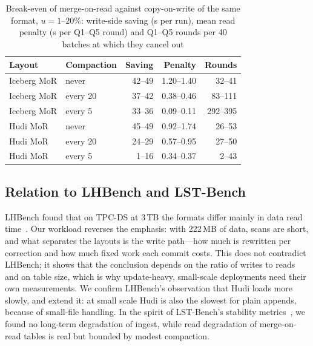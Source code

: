 \documentclass[conference]{IEEEtran}
\begin{document}
\begin{table}[!t]\centering
\caption{Break-even of merge-on-read against copy-on-write of the same format, $u=1$--$20\%$: write-side saving (s per run), mean read penalty
(s per Q1--Q5 round) and Q1--Q5 rounds per 40 batches at which they cancel out}\label{tab:breakeven}
\footnotesize\setlength{\tabcolsep}{3pt}
\begin{tabular}{@{}llrrr@{}}\toprule
Layout & Compaction & Saving & Penalty & Rounds\\\midrule
Iceberg MoR & never & 42--49 & 1.20--1.40 & 32--41\\
Iceberg MoR & every 20 & 37--42 & 0.38--0.46 & 83--111\\
Iceberg MoR & every 5 & 33--36 & 0.09--0.11 & 292--395\\
Hudi MoR & never & 45--49 & 0.92--1.74 & 26--53\\
Hudi MoR & every 20 & 24--29 & 0.57--0.95 & 27--50\\
Hudi MoR & every 5 & 1--16 & 0.34--0.37 & 2--43\\\bottomrule
\end{tabular}
\end{table}

\subsection{Relation to LHBench and LST-Bench}
LHBench found that on TPC-DS at 3\,TB the formats differ mainly in data read time~\cite{jain2023lhbench}. Our
workload reverses the emphasis: with 222\,MB of data, scans are short, and what separates the layouts is the write
path---how much is rewritten per correction and how much fixed work each commit costs. This does not contradict
LHBench; it shows that the conclusion depends on the ratio of writes to reads and on table size, which is why
update-heavy, small-scale deployments need their own measurements. We confirm LHBench's observation that Hudi loads
more slowly, and extend it: at small scale Hudi is also the slowest for plain appends, because of small-file handling.
In the spirit of LST-Bench's stability metrics~\cite{camacho2024lstbench}, we found no long-term degradation of
ingest, while read degradation of merge-on-read tables is real but bounded by modest compaction.
\end{document}
